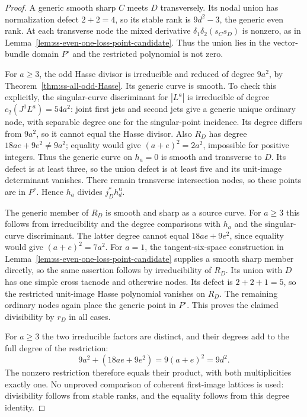 \begin{proof}
A generic smooth sharp $C$ meets $D$ transversely. Its nodal
union has normalization defect $2+2=4$, so its stable rank is
$9d^2-3$, the generic even rank. At each transverse node the
mixed derivative $\delta_1\delta_2(s_Cs_D)$ is nonzero, as in
Lemma~\ref{lem:ss-even-one-loss-point-candidate}. Thus the union
lies in the vector-bundle domain $P^\circ$ and the restricted
polynomial is not zero.

For $a\ge3$, the odd Hasse divisor is irreducible and reduced
of degree $9a^2$, by Theorem~\ref{thm:ss-all-odd-Hasse}.
Its generic curve is smooth. To check this explicitly, the
singular-curve discriminant for $|L^a|$ is irreducible of
degree $c_2(J^1L^a)=54a^2$: joint first jets and second jets
give a generic unique ordinary node, with separable degree one
for the singular-point incidence. Its degree differs from
$9a^2$, so it cannot equal the Hasse divisor.
Also $R_D$ has degree $18ae+9e^2\ne9a^2$; equality would give
$(a+e)^2=2a^2$, impossible for positive integers.
Thus the generic curve on $h_a=0$ is smooth and transverse to
$D$. Its defect is at least three, so the union defect is at
least five and its unit-image determinant vanishes.
There remain transverse intersection nodes, so these points
are in $P^\circ$. Hence $h_a$ divides $j_D^*h_d^{\mathrm u}$.

The generic member of $R_D$ is smooth and sharp as a source
curve. For $a\ge3$ this follows from irreducibility and the
degree comparisons with $h_a$ and the singular-curve
discriminant. The latter degree cannot equal $18ae+9e^2$,
since equality would give $(a+e)^2=7a^2$.
For $a=1$, the tangent-six-space construction in
Lemma~\ref{lem:ss-even-one-loss-point-candidate} supplies a
smooth sharp member directly, so the same assertion follows
by irreducibility of $R_D$.
Its union with $D$ has one simple cross tacnode and otherwise
nodes. Its defect is $2+2+1=5$, so the restricted unit-image
Hasse polynomial vanishes on $R_D$. The remaining ordinary
nodes again place the generic point in $P^\circ$.
This proves the claimed divisibility by $r_D$ in all cases.

For $a\ge3$ the two irreducible factors are distinct, and
their degrees add to the full degree of the restriction:
\[
             9a^2+(18ae+9e^2)=9(a+e)^2=9d^2.
\]
The nonzero restriction therefore equals their product, with
both multiplicities exactly one. No unproved comparison of
coherent first-image lattices is used: divisibility follows
from stable ranks, and the equality follows from this degree
identity.
\end{proof}

